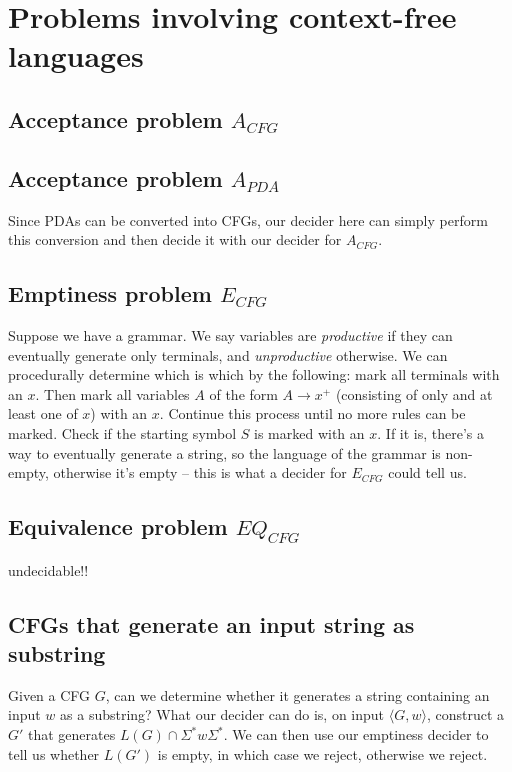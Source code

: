 \documentclass[11pt]{article}
\begin{document}
\newpage
\section{Problems involving context-free languages}
\subsection{Acceptance problem $A_{CFG}$}

\subsection{Acceptance problem $A_{PDA}$}
Since PDAs can be converted into CFGs, our decider here can simply perform this conversion and then decide it with our decider for $A_{CFG}$.

\subsection{Emptiness problem $E_{CFG}$}
Suppose we have a grammar. We say variables are \emph{productive} if they can eventually generate only terminals, and \emph{unproductive} otherwise. We can procedurally determine which is which by the following: mark all terminals with an $x$. Then mark all variables $A$ of the form $A \to x^+$ (consisting of only and at least one of $x$) with an $x$. Continue this process until no more rules can be marked. Check if the starting symbol $S$ is marked with an $x$. If it is, there's a way to eventually generate a string, so the language of the grammar is non-empty, otherwise it's empty -- this is what a decider for $E_{CFG}$ could tell us.

\subsection{Equivalence problem $EQ_{CFG}$}
undecidable!!

\subsection{CFGs that generate an input string as substring}
Given a CFG $G$, can we determine whether it generates a string containing an input $w$ as a substring? What our decider can do is, on input $\langle G, w \rangle$, construct a $G'$ that generates $L(G) \cap \Sigma^* w \Sigma^*$. We can then use our emptiness decider to tell us whether $L(G')$ is empty, in which case we reject, otherwise we reject.
\end{document}
